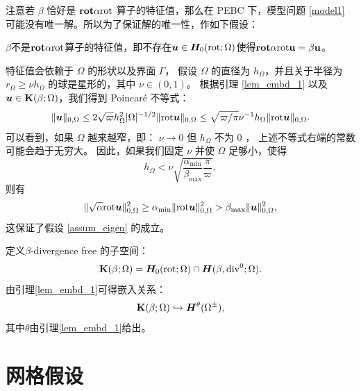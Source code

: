 注意若 $\beta$ 恰好是 $\mathbf{rot} \alpha \mathrm{rot}$ 算子的特征值，那么在 PEBC 下，模型问题
\eqref{model1}
可能没有唯一解。所以为了保证解的唯一性，作如下假设：
\begin{assumption}
\label{assum_eigen}
$\beta$不是$\bf{rot}\alpha\mathrm{rot}$算子的特征值，即不存在$\boldsymbol{u} \in \boldsymbol{H}_0(\mathrm{rot};\Omega)$使得$\bf{rot}\alpha\mathrm{rot} \boldsymbol{u} = \beta \boldsymbol{u}$。
\end{assumption}
\begin{remark}
特征值会依赖于 $\Omega$ 的形状以及界面 $\Gamma$，
假设 $\Omega$ 的直径为 $h_{\Omega}$，并且关于半径为 $r_{\Omega}\ge \nu h_{\Omega}$ 的球是星形的，其中 $\nu\in(0,1)$。  
根据引理 \ref{lem_embd_1} 以及 $\boldsymbol{u} \in \mathbf{K}(\beta;\Omega)$，我们得到 Poincar\'e 不等式：
$$
\| \boldsymbol{u} \|_{0,\Omega} \le 2 \sqrt{\varpi} h^2_{\Omega}|\Omega|^{-1/2} \| \mathrm{rot}\boldsymbol{u} \|_{0,\Omega} 
\le \sqrt{\varpi/\pi} \nu^{-1} h_{\Omega} \| \mathrm{rot}\boldsymbol{u} \|_{0,\Omega}.
$$
可以看到，如果 $\Omega$ 越来越窄，即： $\nu\rightarrow 0$ 但 $h_{\Omega}$ 不为 0 ，
上述不等式右端的常数可能会趋于无穷大。  
因此，如果我们固定 $\nu$ 并使 $\Omega$ 足够小，使得
\begin{equation}
  \label{dom_small_eq1}
  h_{\Omega} <  \nu \sqrt{ \frac{\alpha_{\min}}{\beta_{\max}} \frac{\pi}{\varpi} },
\end{equation}
则有
\begin{equation}
  \label{dom_small_eq2}
\| \sqrt{\alpha} \mathrm{rot} \boldsymbol{u} \|^2_{0,\Omega} \ge \alpha_{\min} \| \mathrm{rot} \boldsymbol{u} \|^2_{0,\Omega} > \beta_{\max} \| \boldsymbol{u} \|^2_{0,\Omega},
\end{equation}
这保证了假设 \ref{assum_eigen} 的成立。
\end{remark}

定义$\beta$-divergence free 的子空间：
\begin{equation}
\label{div_free}
\mathbf{K}(\beta;\Omega) = \boldsymbol{H}_0(\mathrm{rot};\Omega) \cap \boldsymbol{H}(\beta,\mathrm{div}^0;\Omega) .
\end{equation}
由引理\ref{lem_embd_1}可得嵌入关系：
\begin{equation}
\label{lem_embd_2}
\mathbf{K}(\beta;\Omega)  \hookrightarrow \boldsymbol{H}^{\theta}(\Omega^{\pm}),
\end{equation}
其中$\theta$由引理\ref{lem_embd_1}给出。




\section{网格假设}
\label{sec:mesh_assump}

